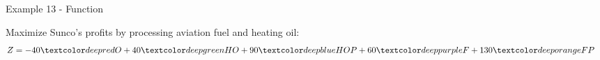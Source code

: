 \begin{frame}{Example 13 - Function}

Maximize Sunco's profits by processing aviation fuel and heating oil:
\Large{
\begin{align*}
    Z &= -40\colora{O} + 40\colorb{HO} + 90\colorc{HOP} + 60\colord{F} + 130\colore{FP}
\end{align*}
}

\end{frame}
